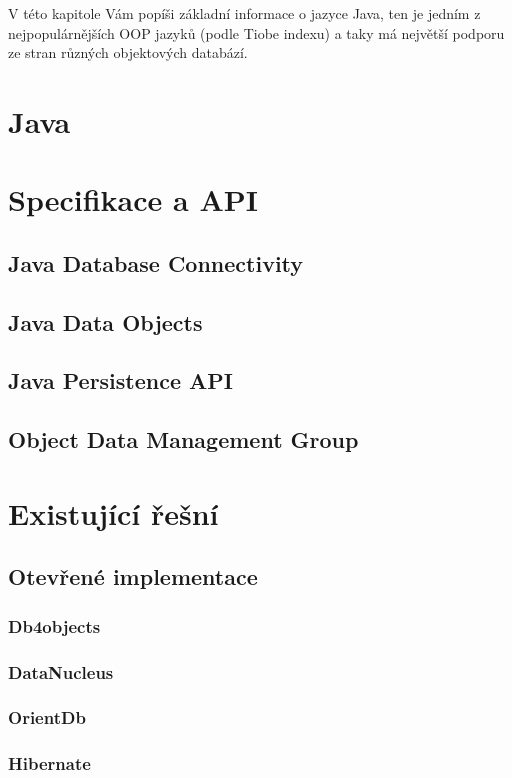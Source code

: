 V této kapitole Vám popíši základní informace o jazyce Java, ten je jedním z nejpopulárnějších OOP jazyků (podle Tiobe indexu) a taky má největší podporu ze stran různých objektových databází. 
\section{Java}

\section{Specifikace a API}
\subsection{Java Database Connectivity}
\cite{fisher:jdbc,donahue:jdpb}
\subsection{Java Data Objects}
\cite{jordan:jdo,roos:jdo,tyagi:cjdo,ezzio:uujdo}
\subsection{Java Persistence API}
\cite{jpa:spec}
\subsection{Object Data Management Group}
\cite{odmg}
\section{Existující řešní}
\subsection{Otevřené implementace}
\subsubsection{Db4objects}
\subsubsection{DataNucleus}
\subsubsection{OrientDb}
\subsubsection{Hibernate}
